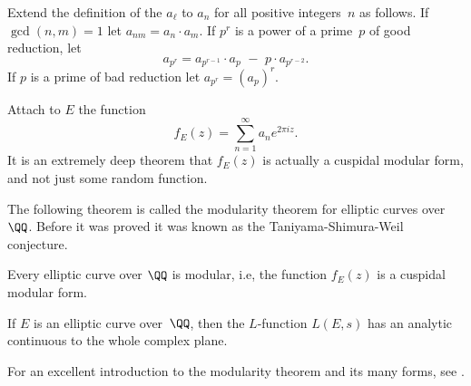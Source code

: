 Extend the definition of the $a_\ell$ to $a_n$ for all positive
integers~$n$ as follows.  If $\gcd(n,m)=1$ let $a_{nm} = a_n \cdot
a_m$.  If $p^r$ is a power of a prime~$p$ of good reduction, let
\[
  a_{p^r} = a_{p^{r-1}}\cdot a_p \,\,-\,\, p \cdot a_{p^{r-2}}.
\]
If $p$ is a prime of bad reduction let $a_{p^r} = (a_p)^r$.

Attach to $E$ the function
\[
  f_E(z) = \sum_{n=1}^{\infty} a_n e^{2\pi i z}.
\]
It is an extremely deep theorem that $f_E(z)$ is actually
a cuspidal modular form, and not just some random function.


The following theorem is called the modularity theorem for elliptic
curves over~$\QQ$.  Before it was proved it was known as the
Taniyama-Shimura-Weil conjecture.
\begin{theorem}
  Every elliptic curve over $\QQ$ is modular, i.e, the function
  $f_E(z)$  is a cuspidal modular form.
\end{theorem}

\begin{corollary}[Hecke]\label{cor:hecke}
  If $E$ is an elliptic curve over~$\QQ$, then the $L$-function
  $L(E,s)$ has an analytic continuous to the whole complex plane.
\end{corollary}
For an excellent introduction to the modularity theorem and its many forms,
see \cite{diamond-shurman}.
